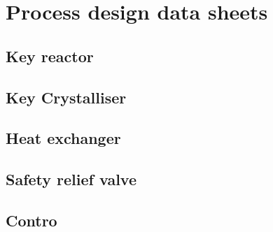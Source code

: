 \section{Process design data sheets}

\subsection{Key reactor}

\subsection{Key Crystalliser}

\subsection{Heat exchanger}

\subsection{Safety relief valve}

\subsection{Contro}

\subsection{}

\subsection{}

\subsection{}

\subsection{}

\subsection{}

\subsection{}
